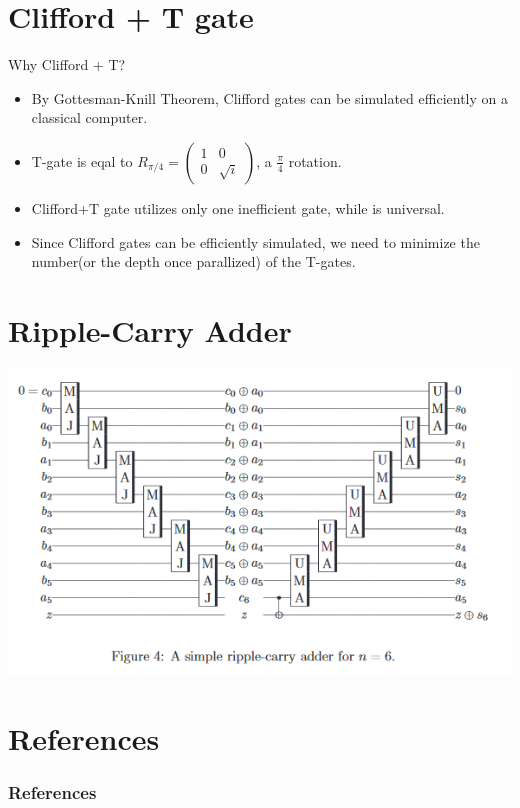 \documentclass{beamer}
\begin{document}
    \section{Clifford + T gate}
    \begin{frame}{Why Clifford + T?}
    	\begin{itemize}
    		\item By Gottesman-Knill Theorem, Clifford gates can be simulated efficiently on a classical computer.
    		\item T-gate is eqal to $R_{\pi/4}=\begin{pmatrix}1 & 0 \\ 0 & \sqrt{i}\end{pmatrix}$, a $\frac{\pi}{4}$ rotation.
    		\item Clifford+T gate utilizes only one inefficient gate, while is universal.
    		\item Since Clifford gates can be efficiently simulated, we need to minimize the number(or the depth once parallized) of the T-gates.
    	\end{itemize}
    \end{frame}
    
    \section{Ripple-Carry Adder}
    \begin{frame}
      \includegraphics[width=\textwidth]{./Images/ripple-carry-adder.jpg}
    \end{frame}
  	
  	\section{}
    
    \section{References}
    \begin{frame}[allowframebreaks]
        \frametitle{References}
        
        
    \end{frame}
\end{document}
